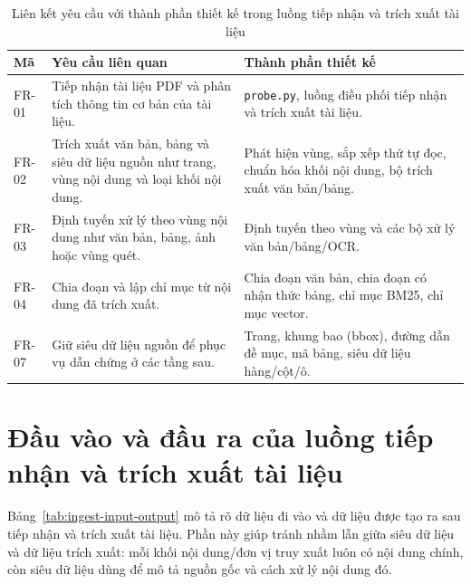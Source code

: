 \documentclass[../DoAn.tex]{subfiles}
\begin{document}
\begin{table}[H]
\centering
\small
\renewcommand{\arraystretch}{1.2}
\caption{Liên kết yêu cầu với thành phần thiết kế trong luồng tiếp nhận và trích xuất tài liệu}
\label{tab:ingest-traceability}
\begin{tabularx}{\textwidth}{
    |>{\raggedright\arraybackslash}p{}
    |>{\raggedright\arraybackslash}X
    |>{\raggedright\arraybackslash}p{}|
}
\hline
\textbf{Mã} & \textbf{Yêu cầu liên quan} & \textbf{Thành phần thiết kế} \\
\hline
FR-01 &
Tiếp nhận tài liệu PDF và phân tích thông tin cơ bản của tài liệu. &
\texttt{probe.py}, luồng điều phối tiếp nhận và trích xuất tài liệu. \\
\hline
FR-02 &
Trích xuất văn bản, bảng và siêu dữ liệu nguồn như trang, vùng nội dung và loại khối nội dung. &
Phát hiện vùng, sắp xếp thứ tự đọc, chuẩn hóa khối nội dung, bộ trích xuất văn bản/bảng. \\
\hline
FR-03 &
Định tuyến xử lý theo vùng nội dung như văn bản, bảng, ảnh hoặc vùng quét. &
Định tuyến theo vùng và các bộ xử lý văn bản/bảng/OCR. \\
\hline
FR-04 &
Chia đoạn và lập chỉ mục từ nội dung đã trích xuất. &
Chia đoạn văn bản, chia đoạn có nhận thức bảng, chỉ mục BM25, chỉ mục vector. \\
\hline
FR-07 &
Giữ siêu dữ liệu nguồn để phục vụ dẫn chứng ở các tầng sau. &
Trang, khung bao (bbox), đường dẫn đề mục, mã bảng, siêu dữ liệu hàng/cột/ô. \\
\hline
\end{tabularx}
\end{table}

\section{Đầu vào và đầu ra của luồng tiếp nhận và trích xuất tài liệu}
\label{section:ingest-input-output}

Bảng~\ref{tab:ingest-input-output} mô tả rõ dữ liệu đi vào và dữ liệu được tạo ra
sau tiếp nhận và trích xuất tài liệu. Phần này giúp tránh nhầm lẫn giữa siêu dữ liệu và dữ liệu trích xuất: mỗi
khối nội dung/đơn vị truy xuất luôn có nội dung chính, còn siêu dữ liệu dùng để mô tả nguồn gốc và
cách xử lý nội dung đó.
\end{document}
